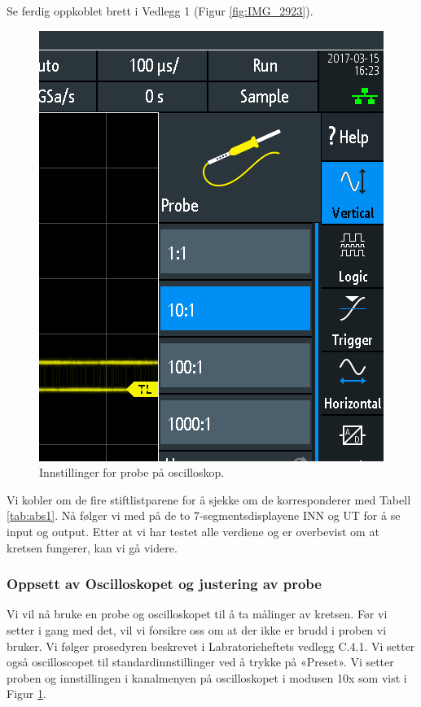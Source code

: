 \documentclass{article}
\begin{document}
Se ferdig oppkoblet brett i Vedlegg 1 (Figur \ref{fig:IMG_2923}).

\begin{figure}
	\includegraphics[scale=0.25]{SCR03}
	\caption{Innstillinger for probe på oscilloskop.}
	\label{fig:inst1}
\end{figure}


Vi kobler om de fire stiftlistparene for å sjekke om de korresponderer med Tabell \ref{tab:abs1}. Nå følger vi med på de to 7-segmentsdisplayene INN og UT for å se input og output. Etter at vi har testet alle verdiene og er overbevist om at kretsen fungerer, kan vi gå videre.

\subsubsection{Oppsett av Oscilloskopet og justering av probe}
Vi vil nå bruke en probe og oscilloskopet til å ta målinger av kretsen. Før vi setter i gang med det, vil vi forsikre oss om at der ikke er brudd i proben vi bruker. Vi følger prosedyren beskrevet i Labratorieheftets vedlegg C.4.1. Vi setter også oscilloscopet til standardinnstillinger ved å trykke på «Preset». Vi setter proben og innstillingen i kanalmenyen på oscilloskopet i modusen 10x som vist i Figur \ref{fig:inst1}.
\end{document}
